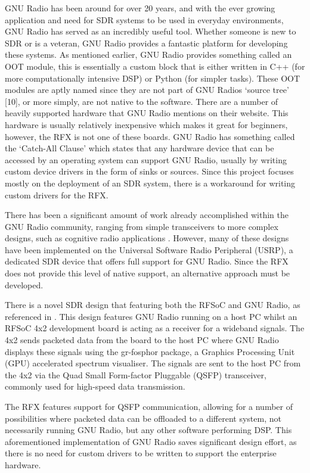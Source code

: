 \documentclass[12pt, a4paper]{article}
\begin{document}
GNU Radio has been around for over 20 years, and with the ever growing application and need for SDR systems to be used in everyday environments, GNU Radio has served as an incredibly useful tool. Whether someone is new to SDR or is a veteran, GNU Radio provides a fantastic platform for developing these systems. As mentioned earlier, GNU Radio provides something called an OOT module, this is essentially a custom block that is either written in C++ (for more computationally intensive DSP) or Python (for simpler tasks). These OOT modules are aptly named since they are not part of GNU Radios ‘source tree’ [10], or more simply, are not native to the software. There are a number of heavily supported hardware that GNU Radio mentions on their website. This hardware is usually relatively inexpensive which makes it great for beginners, however, the RFX is not one of these boards. GNU Radio has something called the ‘Catch-All Clause’ which states that any hardware device that can be accessed by an operating system can support GNU Radio, usually by writing custom device drivers in the form of sinks or sources. Since this project focuses mostly on the deployment of an SDR system, there is a workaround for writing custom drivers for the RFX.

There has been a significant amount of work already accomplished within the GNU Radio community, ranging from simple transceivers to more complex designs, such as cognitive radio applications \cite{Nastase2018}. However, many of these designs have been implemented on the Universal Software Radio Peripheral (USRP), a dedicated SDR device that offers full support for GNU Radio. Since the RFX does not provide this level of native support, an alternative approach must be developed.

There is a novel SDR design that featuring both the RFSoC and GNU Radio, as referenced in \cite{marius_paper}. This design features GNU Radio running on a host PC whilst an RFSoC 4x2 development board is acting as a receiver for a wideband signals. The 4x2 sends packeted data from the board to the host PC where GNU Radio displays these signals using the gr-fosphor package, a Graphics Processing Unit (GPU) accelerated spectrum visualiser. The signals are sent to the host PC from the 4x2 via the Quad Small Form-factor Pluggable (QSFP) transceiver, commonly used for high-speed data transmission.

The RFX features support for QSFP communication, allowing for a number of possibilities where packeted data can be offloaded to a different system, not necessarily running GNU Radio, but any other software performing DSP. This aforementioned implementation of GNU Radio saves significant design effort, as there is no need for custom drivers to be written to support the enterprise hardware.
\end{document}
